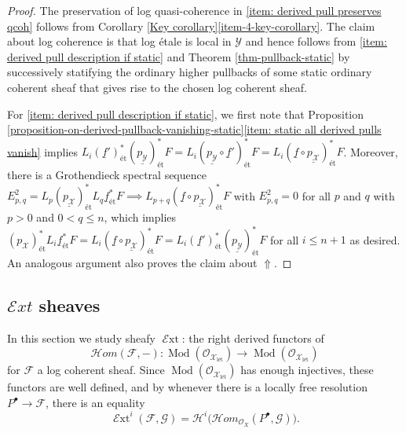 \documentclass[11pt]{amsart}
\theoremstyle{definition}
\theoremstyle{definition}
\newcommand{\ul}[1]{\underline{#1}}
\begin{document}
\begin{proof}
    The preservation of log quasi-coherence in \eqref{item: derived pull preserves qcoh} follows from Corollary \ref{Key corollary}\eqref{item-4-key-corollary}. The claim about log coherence is that log \'etale is local in $\mathcal{Y}$ and hence follows from \eqref{item: derived pull description if static} and Theorem \ref{thm-pullback-static} by successively statifying the ordinary higher pullbacks of some static ordinary coherent sheaf that gives rise to the chosen log coherent sheaf.
    
    For \eqref{item: derived pull description if static}, we first note that Proposition \ref{proposition-on-derived-pullback-vanishing-static}\eqref{item: static all derived pulls vanish} implies $L_i(\ul{f}')_{\text{\'et}}^*(\ul{p_\mathcal{Y}})_\text{\'et}^* F = L_i(\ul{p_\mathcal{Y}}\circ \ul{f}')_\text{\'et}^* F = L_i(\ul{f}\circ \ul{p_\mathcal{X}})_\text{\'et}^* F$. Moreover, there is a Grothendieck spectral sequence $E^2_{p,q} = L_p (\ul{p_\mathcal{X}})_\text{\'et}^* L_q\ul{f}_\text{\'et}^*F\implies L_{p+q}(\ul{f}\circ \ul{p_\mathcal{X}})_{\text{\'et}}^* F$ with $E^2_{p,q}=0$ for all $p$ and $q$ with $p>0$ and $0<q\leq n$, which implies $(p_\mathcal{X})_\text{\'et}^* L_i \ul{f}_\text{\'et}^*F = L_i(\ul{f}\circ \ul{p_\mathcal{X}})_\text{\'et}^*F = L_i (\ul{f}')_\text{\'et}^*(\ul{p_\mathcal{Y}})^*_\text{\'et} F$ for all $i\leq n+1$ as desired. An analogous argument also proves the claim about $\Uparrow$.
\end{proof}

\subsection{\texorpdfstring{$\mathcal{E}xt$}{Ext} sheaves} 
In this section we study sheafy $\operatorname{\mathcal{E}xt}$: the right derived functors of $$\mathcal{H}om(\mathcal{F},-)\colon \operatorname{Mod} (\mathcal{O}_{\mathcal{X}_\text{l\'et}})\longrightarrow \operatorname{Mod} (\mathcal{O}_{\mathcal{X}_\text{l\'et}})$$ for $\mathcal{F}$ a log coherent sheaf. Since $\operatorname{Mod} (\mathcal{O}_{\mathcal{X}_\text{l\'et}})$ has enough injectives, these functors are well defined, and by \cite[TAG 06XR]{stacks} whenever there is a locally free resolution $P^\bullet \rightarrow \mathcal{F}$, there is an equality $$\operatorname{\mathcal{E}xt}^i(\mathcal{F},\mathcal{G})
=\mathcal{H}^i\!\bigl(\mathcal{H}om_{\mathcal O_X}(P^\bullet,\mathcal{G})\bigr).$$
\end{document}
